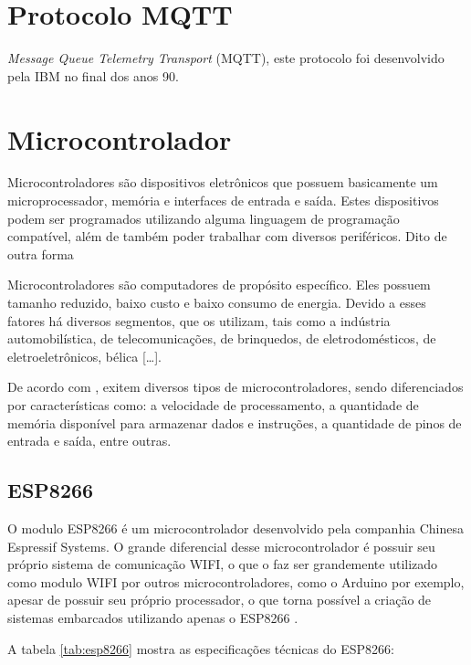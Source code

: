 \section{Protocolo MQTT}

\textit{Message Queue Telemetry Transport} (MQTT), este protocolo foi desenvolvido pela IBM no final dos anos 90. 


\section{Microcontrolador}

Microcontroladores são dispositivos eletrônicos que possuem basicamente um microprocessador, memória e interfaces de entrada e saída. Estes dispositivos podem ser programados utilizando alguma linguagem de programação compatível, além de também poder trabalhar com diversos periféricos. Dito de outra forma

\begin{citacao}
	Microcontroladores são computadores de propósito específico. Eles possuem 
tamanho reduzido, baixo custo e baixo consumo de energia. Devido a esses fatores há diversos segmentos, que os utilizam, tais como a indústria automobilística, de telecomunicações, de brinquedos, de eletrodomésticos, de eletroeletrônicos, bélica [\ldots]. \cite{silva2009}  
\end{citacao}

De acordo com , exitem diversos tipos de microcontroladores, sendo diferenciados por características como: a velocidade de processamento, a quantidade de memória disponível para armazenar dados e instruções, a quantidade de pinos de entrada e saída, entre outras.

\subsection{ESP8266} 

O modulo ESP8266 é um microcontrolador desenvolvido pela companhia Chinesa Espressif Systems.
O grande diferencial desse microcontrolador é possuir seu próprio sistema de comunicação WIFI, o que o faz ser grandemente utilizado como modulo WIFI por outros microcontroladores, como o Arduino por exemplo, apesar de possuir seu próprio processador, o que torna possível a criação de sistemas embarcados utilizando apenas o ESP8266 \cite[p.~26-27]{kolban2015espbook}.

A tabela \ref{tab:esp8266} mostra as especificações técnicas do ESP8266:

